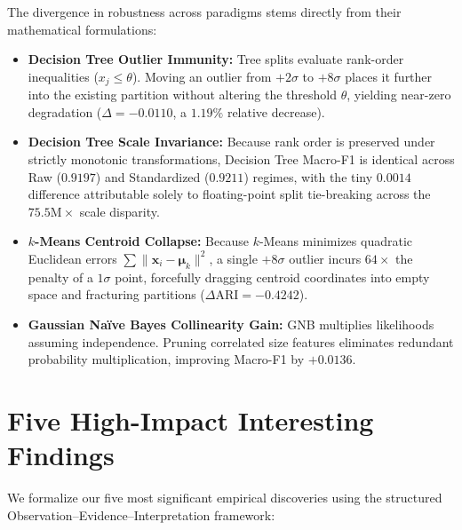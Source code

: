 \documentclass[11pt,a4paper]{article}
\begin{document}
The divergence in robustness across paradigms stems directly from their mathematical formulations:
\begin{itemize}[leftmargin=1.5em]
    \item \textbf{Decision Tree Outlier Immunity:} Tree splits evaluate rank-order inequalities ($x_j \le \theta$). Moving an outlier from $+2\sigma$ to $+8\sigma$ places it further into the existing partition without altering the threshold $\theta$, yielding near-zero degradation ($\Delta = -0.0110$, a $1.19\%$ relative decrease).
    \item \textbf{Decision Tree Scale Invariance:} Because rank order is preserved under strictly monotonic transformations, Decision Tree Macro-F1 is identical across Raw ($0.9197$) and Standardized ($0.9211$) regimes, with the tiny $0.0014$ difference attributable solely to floating-point split tie-breaking across the $75.5\text{M}\times$ scale disparity.
    \item \textbf{$k$-Means Centroid Collapse:} Because $k$-Means minimizes quadratic Euclidean errors $\sum \|\mathbf{x}_i - \boldsymbol{\mu}_k\|^2$, a single $+8\sigma$ outlier incurs $64\times$ the penalty of a $1\sigma$ point, forcefully dragging centroid coordinates into empty space and fracturing partitions ($\Delta \text{ARI} = -0.4242$).
    \item \textbf{Gaussian Naïve Bayes Collinearity Gain:} GNB multiplies likelihoods assuming independence. Pruning correlated size features eliminates redundant probability multiplication, improving Macro-F1 by $+0.0136$.
\end{itemize}

\section{Five High-Impact Interesting Findings}
\label{sec:findings}

We formalize our five most significant empirical discoveries using the structured Observation--Evidence--Interpretation framework:
\end{document}
